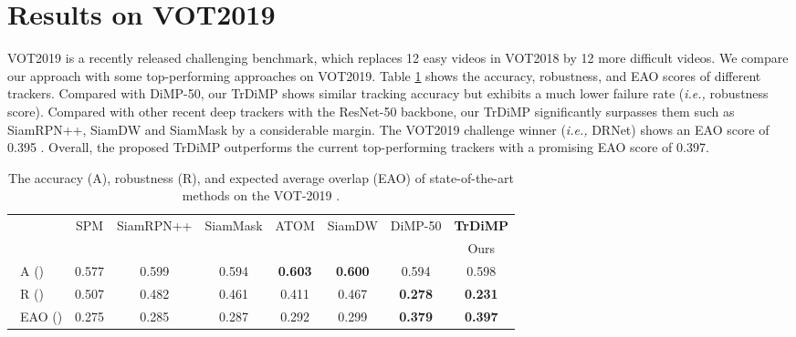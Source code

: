 \documentclass[10pt,twocolumn,letterpaper]{article}
\begin{document}
\section{Results on VOT2019}
VOT2019 \cite{VOT2019} is a recently released challenging benchmark, which replaces 12 easy videos in VOT2018 \cite{VOT2018} by 12 more difficult videos. 
We compare our approach with some top-performing approaches on VOT2019.
Table \ref{table:vot} shows the accuracy, robustness, and EAO scores of different trackers.
Compared with DiMP-50, our TrDiMP shows similar tracking accuracy but exhibits a much lower failure rate (\emph{i.e.,} robustness score).
Compared with other recent deep trackers with the ResNet-50 backbone, our TrDiMP significantly surpasses them such as SiamRPN++, SiamDW \cite{deeperwiderSiamFC} and SiamMask \cite{SiamMask} by a considerable margin.
The VOT2019 challenge winner (\emph{i.e.,} DRNet) shows an EAO score of 0.395 \cite{VOT2019}.
Overall, the proposed TrDiMP outperforms the current top-performing trackers with a promising EAO score of 0.397.



\setlength{\tabcolsep}{2pt}
\begin{table}[t]
	\scriptsize
	\begin{center}
		\caption{The accuracy (A), robustness (R), and expected average overlap (EAO) of state-of-the-art methods on the VOT-2019 \cite{VOT2019}.} \label{table:vot}	
		\vspace{+0.05in} 
		\begin{tabular*}{8.2 cm} {@{\extracolsep{\fill}}lccccccc}
			\hline
			&SPM &SiamRPN++ &SiamMask &ATOM  &SiamDW &DiMP-50 &{\bf TrDiMP} \\
			&\cite{SPM} &\cite{siamrpn++} &\cite{SiamMask} &\cite{ATOM}  &\cite{deeperwiderSiamFC} &\cite{DiMP} &Ours \\
			\hline  
			~A ()  &0.577 &0.599 &0.594  &{\bf \color{red} 0.603} &{\bf \color{blue} 0.600} &0.594 & 0.598  \\
			~R () &0.507 &0.482 &0.461  &0.411 &0.467 &{\bf \color{blue} 0.278} & {\bf \color{red} 0.231}  \\
			~EAO ()  &0.275 &0.285 &0.287 &0.292   &0.299 &{\bf \color{blue} 0.379} & {\bf \color{red} 0.397}  \\
			\hline
		\end{tabular*}
	\end{center}
\vspace{-0.2in}
\end{table}  
\end{document}
